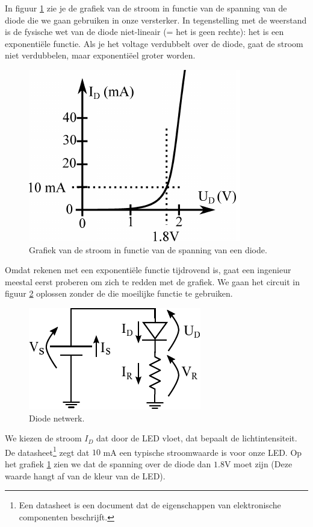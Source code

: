\documentclass{article}
\begin{document}
			In figuur \ref{fig:diode_grafiek} zie je de grafiek van de stroom in functie van de spanning van de diode die we gaan gebruiken in onze versterker. In tegenstelling met de weerstand is de fysische wet van de diode niet-lineair (= het is geen rechte): het is een exponenti\"ele functie. Als je het voltage verdubbelt over de diode, gaat de stroom niet verdubbelen, maar exponenti\"eel groter worden.
				\begin{figure}[htbp]
					\centering
					\includegraphics{diode_grafiek}
					\caption{Grafiek van de stroom in functie van de spanning van een diode.}
					\label{fig:diode_grafiek}
				\end{figure}
				
			Omdat rekenen met een exponenti\"ele functie tijdrovend is, gaat een ingenieur meestal eerst proberen om zich te redden met de grafiek. We gaan het circuit in figuur \ref{fig:diode_netwerk} oplossen zonder de die moeilijke functie te gebruiken.

			\begin{figure}[htbp]
				\centering
				\includegraphics{diode_netwerk}
				\caption{Diode netwerk.}
				\label{fig:diode_netwerk}
			\end{figure}

			We kiezen de stroom $I_D$ dat door de LED vloet, dat bepaalt de lichtintensiteit. De datasheet\footnote{Een datasheet is een document dat de eigenschappen van elektronische componenten beschrijft.} zegt dat $10$ mA een typische stroomwaarde is voor onze LED. Op het grafiek \ref{fig:diode_grafiek} zien we dat de spanning over de diode dan $1.8 $V moet zijn (Deze waarde hangt af van de kleur van de LED). 
\end{document}
